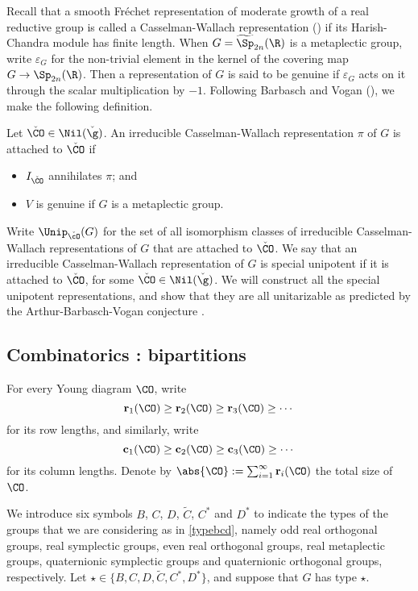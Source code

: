 \documentclass[ssunip.tex]{subfiles}
\begin{document}
Recall that a  smooth Fr\'echet representation of  moderate growth  of a real reductive group is called a Casselman-Wallach representation (\cite{Ca89,Wa2}) if its Harish-Chandra module has  finite length. When $G=\widetilde \Sp_{2n}(\R)$ is a metaplectic group, write $\varepsilon_G$ for the non-trivial element in the kernel of the covering map $G\rightarrow \Sp_{2n}(\R)$. Then a representation of $G$ is said to be genuine if $\varepsilon_G$ acts on it through the scalar multiplication by $-1$.
Following Barbasch and Vogan (\cite{ABV,BVUni}), we make the following definition.

\begin{defn}
Let $\check \CO\in \Nil(\check \g)$. An irreducible Casselman-Wallach representation $\pi$ of $G$  is attached to $\check \CO$ if
\begin{itemize}
\item  $I_{\check \CO}$ annihilates $\pi$; and
\item $V$ is genuine if $G$ is a metaplectic group.
\end{itemize}
\end{defn}

Write  $\Unip_{\check \cO}(G)$ for the  set of all isomorphism classes of irreducible Casselman-Wallach  representations of $G$ that are attached to $\check \CO$.
We say that an irreducible Casselman-Wallach representation  of $G$ is special unipotent if it is attached to $\check \CO$, for some $\check \CO\in \Nil(\check \g)$.
We will construct all the special unipotent representations, and show that they are all unitarizable as predicted by  the Arthur-Barbasch-Vogan conjecture \cite[Introduction]{ABV}.



\subsection{Combinatorics :  bipartitions}\label{secbip}

For every Young diagram $\CO$, write
\[
 \mathbf r_1(\CO)\geq \mathbf r_2(\CO)\geq \mathbf r_3(\CO)\geq \cdots
\]
for its row lengths, and similarly,
write
\[
 \mathbf c_1(\CO)\geq \mathbf c_2(\CO)\geq \mathbf c_3(\CO)\geq \cdots
\]
for its column lengths.
Denote by $\abs{\CO}:=\sum_{i=1}^\infty \mathbf r_i(\CO)$ the total size of $\CO$.

We introduce six symbols $B$, $C$, $D$, $\widetilde {C}$, $C^*$ and $D^*$ to indicate the types of the groups that we are considering as in \eqref{typebcd}, namely odd real orthogonal groups, real symplectic groups, even real orthogonal groups, real metaplectic groups, quaternionic symplectic groups and quaternionic orthogonal groups, respectively.
  Let $\star\in \{B,C,D,\widetilde {C}, C^*, D^*\}$, and suppose that $G$ has type $\star$.
\end{document}
